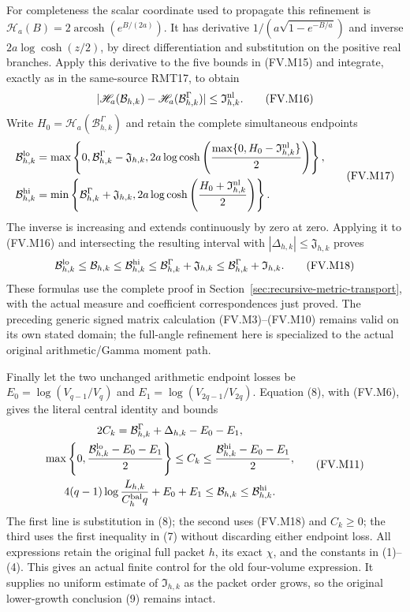 For completeness the scalar coordinate used to propagate this refinement
is $\mathscr H_a(B)=2\operatorname{arcosh}(e^{B/(2a)})$.
It has derivative $1/(a\sqrt{1-e^{-B/a}})$ and inverse
$2a\log\cosh(z/2)$, by direct differentiation and substitution on the
positive real branches. Apply this derivative to the five bounds in
(FV.M15) and integrate, exactly as in the same-source RMT17, to obtain
\[
 |\mathscr H_a(\mathcal B_{h,k})
           -\mathscr H_a(\mathcal B^\Gamma_{h,k})|
       \le\mathfrak I_{h,k}^{\rm nl}.
 \tag{FV.M16}\label{fvmetric:recursive-coordinate}
\]
Write $H_0=\mathscr H_a(\mathcal B^\Gamma_{h,k})$ and retain the
complete simultaneous endpoints
\[
 \begin{aligned}
 \mathcal B_{h,k}^{\rm lo}
 &=\max\left\{0,\mathcal B^\Gamma_{h,k}-\mathfrak J_{h,k},
 2a\log\cosh\left(\frac{\max\{0,H_0-\mathfrak I_{h,k}^{\rm nl}\}}2\right)
                                                        \right\},\\
 \mathcal B_{h,k}^{\rm hi}
 &=\min\left\{\mathcal B^\Gamma_{h,k}+\mathfrak J_{h,k},
 2a\log\cosh\left(\frac{H_0+\mathfrak I_{h,k}^{\rm nl}}2\right)
                                                        \right\}.
 \end{aligned}\tag{FV.M17}\label{fvmetric:recursive-endpoints}
\]
The inverse is increasing and extends continuously by zero at zero.
Applying it to (FV.M16) and intersecting the resulting interval with
$|\Delta_{h,k}|\le\mathfrak J_{h,k}$ proves
\[
 \mathcal B_{h,k}^{\rm lo}\le\mathcal B_{h,k}
 \le\mathcal B_{h,k}^{\rm hi}
 \le\mathcal B^\Gamma_{h,k}+\mathfrak J_{h,k}
 \le\mathcal B^\Gamma_{h,k}+\mathfrak I_{h,k}.
 \tag{FV.M18}\label{fvmetric:recursive-budget}
\]
These formulas use the complete proof in
Section~\ref{sec:recursive-metric-transport}, with the actual measure
and coefficient correspondences just proved. The preceding generic
signed matrix calculation (FV.M3)--(FV.M10) remains valid on its own
stated domain; the full-angle refinement here is specialized to the
actual original arithmetic/Gamma moment path.

Finally let the two unchanged arithmetic endpoint losses be
$E_0=\log(V_{q-1}/V_q)$ and $E_1=\log(V_{2q-1}/V_{2q})$.
Equation (8), with (FV.M6), gives the literal central identity and bounds
\[
 \begin{gathered}
 2C_k=\mathcal B^\Gamma_{h,k}+\Delta_{h,k}-E_0-E_1,\\
 \max\left\{0,\frac{\mathcal B_{h,k}^{\rm lo}-E_0-E_1}{2}\right\}
 \le C_k\le
 \frac{\mathcal B_{h,k}^{\rm hi}-E_0-E_1}{2},\\
 4(q-1)\log\frac{L_{h,k}}{C_h^{\rm bal}q}+E_0+E_1
 \le\mathcal B_{h,k}\le\mathcal B_{h,k}^{\rm hi}.
 \end{gathered}\tag{FV.M11}\label{fvmetric:central}
\]
The first line is substitution in (8); the second uses (FV.M18) and
$C_k\ge0$; the third uses the first inequality in (7) without
discarding either endpoint loss. All expressions retain the original
full packet $h$, its exact $\chi$, and the constants in (1)--(4).
This gives an actual finite control for the old four-volume expression.
It supplies no uniform estimate of $\mathfrak I_{h,k}$ as the packet
order grows, so the original lower-growth conclusion (9) remains intact.

